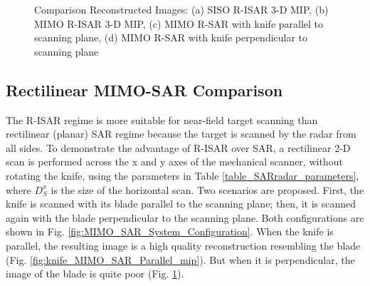\documentclass[conference]{IEEEtran}
\begin{document}
\begin{figure} [h]
\begin{subfigure}{.5\linewidth}
				\caption{}
				\label{fig:knife_MIMO_SAR_Perp_mip}
			\end{subfigure}
			\caption{Comparison Reconstructed Images: (a) SISO R-ISAR 3-D MIP, (b) MIMO R-ISAR 3-D MIP, (c) MIMO R-SAR with knife parallel to scanning plane, (d) MIMO R-SAR with knife perpendicular to scanning plane}
			\label{fig:knife_MIMO}
		\end{figure}
	
		\subsection{Rectilinear MIMO-SAR Comparison}
		The R-ISAR regime is more suitable for near-field target scanning than rectilinear (planar) SAR regime because the target is scanned by the radar from all sides. To demonstrate the advantage of R-ISAR over SAR, a rectilinear 2-D scan is performed across the x and y axes of the mechanical scanner, without rotating the knife, using the parameters in Table \ref{table_SARradar_parameters}, where $D^x_S$ is the size of the horizontal scan. Two scenarios are proposed. First, the knife is scanned with its blade parallel to the scanning plane; then, it is scanned again with the blade perpendicular to the scanning plane. Both configurations are shown in Fig. \ref{fig:MIMO_SAR_System_Configuration}. When the knife is parallel, the resulting image is a high quality reconstruction resembling the blade (Fig. \ref{fig:knife_MIMO_SAR_Parallel_mip}). But when it is perpendicular, the image of the blade is quite poor (Fig. \ref{fig:knife_MIMO_SAR_Perp_mip}).
		
\end{document}

